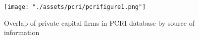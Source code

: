 
\begin{figure}[tb]
    \centering
\texttt{[image: "./assets/pcri/pcrifigure1.png"]}
\caption{Overlap of private capital firms in PCRI database by source of information\label{fig:pcrifigure1}}
\end{figure}